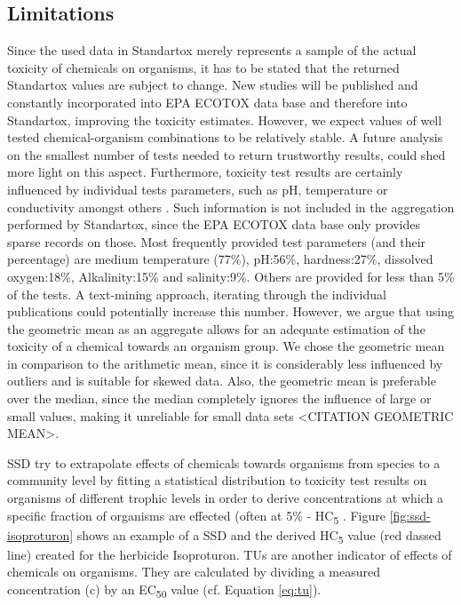 \subsection*{Limitations}
Since the used data in Standartox merely represents a sample of the actual toxicity of chemicals on organisms, it has to be stated that the returned Standartox values are subject to change. New studies will be published and constantly incorporated into EPA ECOTOX data base and therefore into Standartox, improving the toxicity estimates. However, we expect values of well tested chemical-organism combinations to be relatively stable. A future analysis on the smallest number of tests needed to return trustworthy results, could shed more light on this aspect. Furthermore, toxicity test results are certainly influenced by individual tests parameters, such as pH, temperature or conductivity amongst others \citep{rosenkrantz_influence_2013, li_temperature_2011}. Such information is not included in the aggregation performed by Standartox, since the EPA ECOTOX data base only provides sparse records on those. Most frequently provided test parameters (and their percentage) are medium temperature (77\%), pH:56\%, hardness:27\%, dissolved oxygen:18\%, Alkalinity:15\% and salinity:9\%. Others are provided for less than 5\% of the tests. A text-mining approach, iterating through the individual publications could potentially increase this number. However, we argue that using the geometric mean as an aggregate allows for an adequate estimation of the toxicity of a chemical towards an organism group. We chose the geometric mean in comparison to the arithmetic mean, since it is considerably less influenced by outliers and is suitable for skewed data. Also, the geometric mean is preferable over the median, since the median completely ignores the influence of large or small values, making it unreliable for small data sets <CITATION GEOMETRIC MEAN>.

\iffalse
SSD try to extrapolate effects of chemicals towards organisms from species to a community level by fitting a statistical distribution to toxicity test results on organisms of different trophic levels in order to derive concentrations at which a specific fraction of organisms are effected (often at 5\% - HC\textsubscript{5} \citep{posthuma_species_2002}. Figure \ref{fig:ssd-isoproturon} shows an example of a SSD and the derived HC\textsubscript{5} value (red dassed line) created for the herbicide Isoproturon. TUs are another indicator of effects of chemicals on organisms. They are calculated by dividing a measured concentration (c) by an EC\textsubscript{50} value (cf. Equation \ref{eq:tu}).

